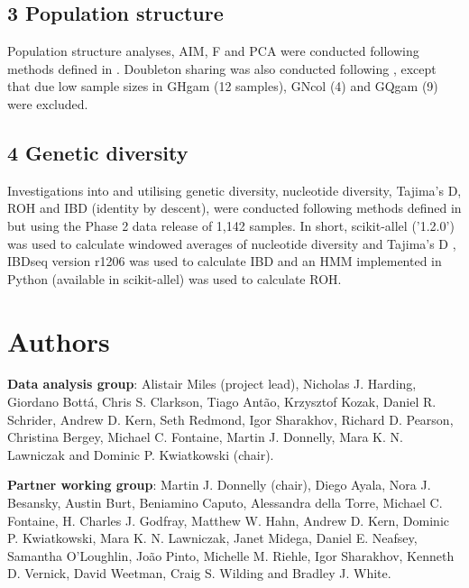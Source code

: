 \documentclass[a4paper,11pt,abstracton,hidelinks]{scrartcl}
\begin{document}
\subsection*{3 Population structure}

%
Population structure analyses, AIM, F and PCA were conducted following methods defined in \cite{Ag1000gConsortium2017}.
%
Doubleton sharing was also conducted following \cite{Ag1000gConsortium2017}, except that due low sample sizes in GHgam (12 samples), GNcol (4) and GQgam (9) were excluded.  


\subsection*{4 Genetic diversity}

%
Investigations into and utilising genetic diversity, nucleotide diversity, Tajima's D, ROH and IBD (identity by descent), were conducted following methods defined in \cite{Ag1000gConsortium2017} but using the Phase 2 data release of 1,142 samples.
%
In short, scikit-allel ('1.2.0') was used to calculate windowed averages of nucleotide diversity and Tajima's D \cite{miles2018}, IBDseq version r1206 \cite{browning2015} was used to calculate IBD and an	HMM	implemented	in	Python (available in scikit-allel) was used to calculate ROH.

\section*{Authors}

%
\textbf{Data analysis group}: Alistair Miles (project lead), Nicholas J. Harding, Giordano Bott\'{a}, Chris S. Clarkson, Tiago Ant\~{a}o, Krzysztof Kozak, Daniel R. Schrider, Andrew D. Kern, Seth Redmond, Igor Sharakhov, Richard D. Pearson, Christina Bergey, Michael C. Fontaine, Martin J. Donnelly, Mara K. N. Lawniczak and Dominic P. Kwiatkowski (chair).

%
\textbf{Partner working group}: Martin J. Donnelly (chair), Diego Ayala, Nora J. Besansky, Austin Burt, Beniamino Caputo, Alessandra della Torre, Michael C. Fontaine, H. Charles J. Godfray, Matthew W. Hahn, Andrew D. Kern, Dominic P. Kwiatkowski, Mara K. N. Lawniczak, Janet Midega, Daniel E. Neafsey, Samantha O'Loughlin, Jo\~{a}o Pinto, Michelle M. Riehle, Igor Sharakhov, Kenneth D. Vernick, David Weetman, Craig S. Wilding and Bradley J. White.
\end{document}
